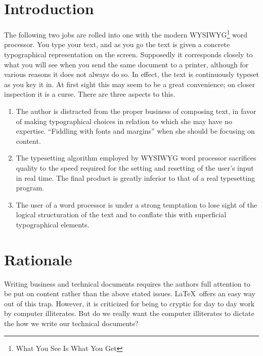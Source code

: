 \documentclass[12pt,twoside]{article}
\title{\doctitle}
\author{\preparedby}
\begin{document}
\maketitle
\thispagestyle{fancy}
\tableofcontents


\newpage
\section{Introduction}
The following two jobs are rolled into one with the modern WYSIWYG\footnote{What You See
Is What You Get} word processor.
You type your text, and as you go the text is given a concrete typographical
representation on the screen. Supposedly it corresponds closely to what you will
see when you send the same document to a printer, although for various reasons it
does not always do so. In effect, the text is continuously typeset as you key it
in. At first sight this may seem to be a great convenience; on closer inspection
it is a curse. There are three aspects to this.

\begin{enumerate}
        \item The author is distracted from the proper business of composing text,
        in favor of making typographical choices in relation to which she may have
        no expertise. ``Fiddling with fonts and margins'' when she should be
        focusing on content.

        \item The typesetting algorithm employed by WYSIWYG word processor sacrifices
        quality to the speed required for the setting and resetting of the user's
        input in real time. The final product is greatly inferior to that of a
        real typesetting program.

        \item The user of a word processor is under a strong temptation to lose
        sight of the logical structuration of the text and to conflate this with
        superficial typographical elements.
\end{enumerate}

\section{Rationale}
Writing business and technical documents requires the authors full attention to
be put on content rather than the above stated issues. \LaTeX\ offers an easy
way out of this trap. However, it is criticized for being to cryptic for day to
day work by computer illiterates. But do we really want the computer illiterates
to dictate the how we write our technical documents?
\end{document}
